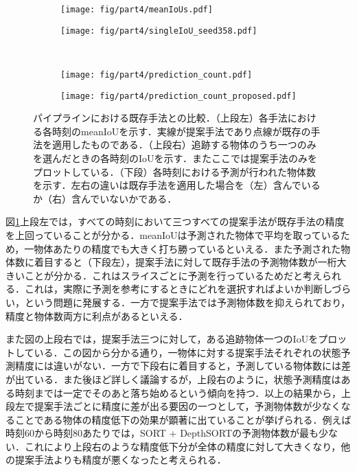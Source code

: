 \begin{figure}[t]
    \begin{subfigure}[t]{0.5\linewidth}
        \centering
        \texttt{[image: fig/part4/meanIoUs.pdf]}
    \end{subfigure}
    \hfill
    \begin{subfigure}[t]{.5\linewidth}
        \centering
        \texttt{[image: fig/part4/singleIoU\_seed358.pdf]}
    \end{subfigure}
    \\    
    \begin{subfigure}[t]{0.5\linewidth}
        \centering
        \texttt{[image: fig/part4/prediction\_count.pdf]} 
    \end{subfigure}
    \hfill
    \begin{subfigure}[t]{.5\linewidth}
        \centering
        \texttt{[image: fig/part4/prediction\_count\_proposed.pdf]}
    \end{subfigure}
    \vspace{-3zh}
    \caption[パイプラインにおける既存手法との比較]{パイプラインにおける既存手法との比較．（上段左）各手法における各時刻のmeanIoUを示す．実線が提案手法であり点線が既存の手法を適用したものである．（上段右）追跡する物体のうち一つのみを選んだときの各時刻のIoUを示す．またここでは提案手法のみをプロットしている．（下段）各時刻における予測が行われた物体数を示す．左右の違いは既存手法を適用した場合を（左）含んでいるか（右）含んでいないかである．}
    \label{fig:pipeline_assessment}
\end{figure}

図\ref{fig:pipeline_assessment}上段左では，すべての時刻において三つすべての提案手法が既存手法の精度を上回っていることが分かる．meanIoUは予測された物体で平均を取っているため，一物体あたりの精度でも大きく打ち勝っているといえる．また予測された物体数に着目すると（下段左），提案手法に対して既存手法の予測物体数が一桁大きいことが分かる．これはスライスごとに予測を行っているためだと考えられる．これは，実際に予測を参考にするときにどれを選択すればよいか判断しづらい，という問題に発展する．一方で提案手法では予測物体数を抑えられており，精度と物体数両方に利点があるといえる．

また図の上段右では，提案手法三つに対して，ある追跡物体一つのIoUをプロットしている．この図から分かる通り，一物体に対する提案手法それぞれの状態予測精度には違いがない．一方で下段右に着目すると，予測している物体数には差が出ている．また後ほど詳しく議論するが，上段右のように，状態予測精度はある時刻までは一定でそのあと落ち始めるという傾向を持つ．以上の結果から，上段左で提案手法ごとに精度に差が出る要因の一つとして，予測物体数が少なくなることである物体の精度低下の効果が顕著に出ていることが挙げられる．例えば時刻$60$から時刻$80$あたりでは，SORT + DepthSORTの予測物体数が最も少ない．これにより上段右のような精度低下分が全体の精度に対して大きくなり，他の提案手法よりも精度が悪くなったと考えられる．

